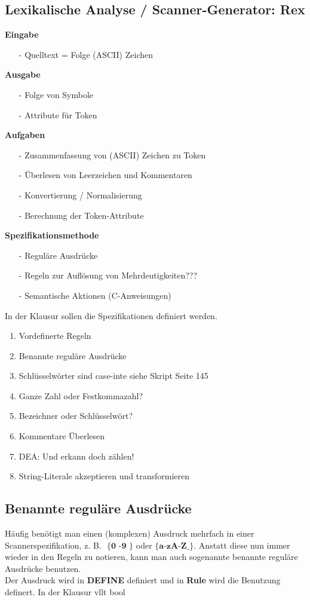 \subsection*{Lexikalische Analyse / Scanner-Generator: Rex}
\textbf{Eingabe}
\begin{itemize}
    
    \item [-] Quelltext = Folge (ASCII) Zeichen
\end{itemize}
\textbf{Ausgabe}
\begin{itemize}
    \item [-] Folge von Symbole
    \item [-] Attribute für Token
\end{itemize}
\textbf{Aufgaben}
\begin{itemize}
    \item [-] Zusammenfassung von (ASCII) Zeichen zu Token
    \item [-] Überlesen von Leerzeichen und Kommentaren
    \item [-] Konvertierung / Normalisierung
    \item [-] Berechnung der Token-Attribute
\end{itemize}
\textbf{Spezifikationsmethode}
\begin{itemize}
    \item [-] Reguläre Ausdrücke
    \item [-] Regeln zur Auflösung von Mehrdeutigkeiten???
    \item [-] Semantische Aktionen (C-Anweisungen)\\
\end{itemize}
In der Klausur sollen die Spezifikationen definiert werden. 
\begin{enumerate}
    \item Vordefinerte Regeln
    \item Benannte reguläre Ausdrücke
    \item Schlüsselwörter sind case-inte siehe Skript Seite 145
    \item Ganze Zahl oder Festkommazahl?
    \item Bezeichner oder Schlüsselwört?
    \item Kommentare Überlesen
    \item DEA: Und erkann doch zählen!
    \item String-Literale akzeptieren und transformieren
\end{enumerate}
\subsection{Benannte reguläre Ausdrücke}
Häufig benötigt man einen (komplexen) Ausdruck 
mehrfach in einer Scannerspezifikation, z. B. $\textbf{ \{ 0 -9 \} }$ oder $\textbf{\{a-zA-Z\_\}}$. 
Anstatt diese nun immer wieder in den Regeln zu notieren, kann man auch sogenannte benannte reguläre Ausdrücke benutzen.\\
Der Ausdruck wird in \textbf{DEFINE} definiert und in \textbf{Rule} wird die Benutzung definert.
%
In der Klausur vllt bool
